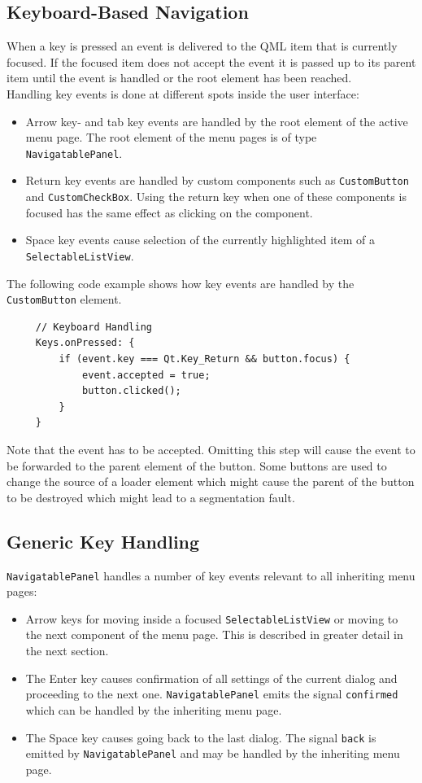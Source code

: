 \subsection{Keyboard-Based Navigation}
When a key is pressed an event is delivered to the QML item that is currently focused. If the focused item does not accept the event it is passed up to its parent item until the event is handled or the root element has been reached. \\
Handling key events is done at different spots inside the user interface:
\begin {itemize}
	\item {
		Arrow key- and tab key events are handled by the root element of the active menu page. The root element of the menu pages is of type {\tt NavigatablePanel}.
	}
	\item {
		Return key events are handled by custom components such as {\tt CustomButton} and {\tt CustomCheckBox}. Using the return key when one of these components is focused has the same effect as clicking on the component.
	}
	\item {
		Space key events cause selection of the currently highlighted item of a {\tt SelectableListView}.
	}
\end {itemize}
The following code example shows how key events are handled by the {\tt CustomButton} element. 
\begin{lstlisting}
     // Keyboard Handling
     Keys.onPressed: {
         if (event.key === Qt.Key_Return && button.focus) {
             event.accepted = true;
             button.clicked();
         }
     }
\end{lstlisting}
Note that the event has to be accepted. Omitting this step will cause the event to be forwarded to the parent element of the button. Some buttons are used to change the source of a loader element which might cause the parent of the button to be destroyed which might lead to a segmentation fault.

\subsection{Generic Key Handling}
{\tt NavigatablePanel} handles a number of key events relevant to all inheriting menu pages:
\begin {itemize}
	\item {Arrow keys for moving inside a focused {\tt SelectableListView} or moving to the next component of the menu page. This is described in greater detail in the next section.}
	\item {The Enter key causes confirmation of all settings of the current dialog and proceeding to the next one. {\tt NavigatablePanel} emits the signal {\tt confirmed} which can be handled by the inheriting menu page.}
	\item {The Space key causes going back to the last dialog. The signal {\tt back} is emitted by {\tt NavigatablePanel} and may be handled by the inheriting menu page.}
\end {itemize}

